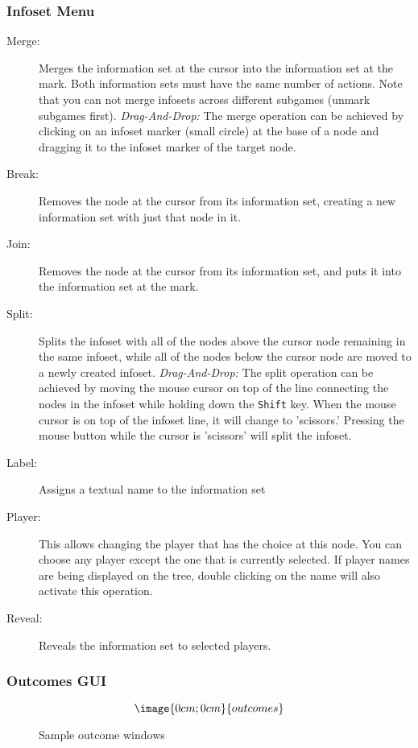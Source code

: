 \subsubsection{Infoset Menu}
\begin{description}
\item[Merge:] Merges the information set at the cursor into the information set at 
the mark.  Both information sets must have the same number of actions.  Note
that you can not merge infosets across different subgames (unmark subgames first).
{\em Drag-And-Drop:} The merge operation can be achieved by clicking on an
infoset marker (small circle) at the base of a node and dragging it to the
infoset marker of the target node.  
\item[Break:] Removes the node at the cursor from its information set, creating a new 
information set with just that node in it. 
\item[Join:] Removes the node at the cursor from its information set, and puts it into 
the information set at the mark.  
\item[Split:] Splits the infoset with all of the nodes above the cursor node
remaining in the same infoset, while all of the nodes below the cursor node
are moved to a newly created infoset.
{\em Drag-And-Drop:} The split operation can be achieved by moving the mouse
cursor on top of the line connecting the nodes in the infoset while holding
down the {\tt Shift} key.  When the mouse cursor is on top of the infoset
line, it will change to 'scissors.'  Pressing the mouse button while the cursor
is 'scissors' will split the infoset.
\item[Label:] Assigns a textual name to the information set
\item[Player:]  This allows changing the player that has the choice
at this node.  You can choose any player except the one that is currently
selected.  If player names are being displayed on the tree, double clicking
on the name will also activate this operation.
\item[Reveal:] Reveals the information set to selected players.
\end{description}

\subsubsection{Outcomes GUI}
\begin{figure}
$$\image{0cm;0cm}{outcomes}$$
\caption{Sample outcome windows}\label{fig_outcomes}
\end{figure}

